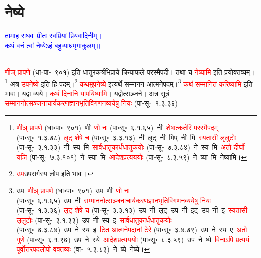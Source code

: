 \section[नेष्ये]{नेष्ये}
\centering\textcolor{blue}{तामाह राघवः प्रीतः स्वप्रियां प्रियवादिनीम्।\nopagebreak\\
कथं वनं त्वां नेष्येऽहं बहुव्याघ्रमृगाकुलम्॥}\nopagebreak\\
\\
\fontsize{14}{21}\selectfont\begin{sloppypar}\justifying\noindent\hspace{10mm} \textcolor{red}{णीञ् प्रापणे} (धा॰पा॰~९०१) इति धातुरकर्त्रभिप्राये क्रियाफले परस्मैपदी। तथा च \textcolor{red}{नेष्यामि} इति प्रयोक्तव्यम्।\footnote{\textcolor{red}{णीञ् प्रापणे} (धा॰पा॰~९०१)~\arrow णी~\arrow \textcolor{red}{णो नः} (पा॰सू॰~६.१.६५)~\arrow नी~\arrow \textcolor{red}{शेषात्कर्तरि परस्मैपदम्} (पा॰सू॰~१.३.७८)~\arrow \textcolor{red}{लृट् शेषे च} (पा॰सू॰~३.३.१३)~\arrow नी~लृट्~\arrow नी~मिप्~\arrow नी~मि~\arrow \textcolor{red}{स्यतासी लृलुटोः} (पा॰सू॰~३.१.३३)~\arrow नी~स्य~मि~\arrow \textcolor{red}{सार्वधातुकार्ध\-धातुकयोः} (पा॰सू॰~७.३.८४)~\arrow ने~स्य~मि~\arrow \textcolor{red}{अतो दीर्घो यञि} (पा॰सू॰~७.३.१०१)~\arrow ने~स्या~मि~\arrow \textcolor{red}{आदेश\-प्रत्यययोः} (पा॰सू॰~८.३.५९)~\arrow ने~ष्या~मि~\arrow नेष्यामि।} अत्र \textcolor{red}{उपनेष्ये} इति हि पदम्।\footnote{\textcolor{red}{उप}उपसर्गस्य लोप इति भावः।} \textcolor{red}{कथमुपनेष्ये} इत्यर्थे सम्मानन आत्मनेपदम्।\footnote{उप~\textcolor{red}{णीञ् प्रापणे} (धा॰पा॰~९०१)~\arrow उप~णी~\arrow \textcolor{red}{णो नः} (पा॰सू॰~६.१.६५)~\arrow उप~नी~\arrow \textcolor{red}{सम्माननोत्सञ्जनाचार्य\-करण\-ज्ञान\-भृति\-विगणन\-व्ययेषु नियः} (पा॰सू॰~१.३.३६)~\arrow \textcolor{red}{लृट् शेषे च} (पा॰सू॰~३.३.१३)~\arrow उप~नी~लृट्~\arrow उप~नी~इट्~\arrow उप~नी~इ~\arrow \textcolor{red}{स्यतासी लृलुटोः} (पा॰सू॰~३.१.३३)~\arrow उप~नी~स्य~इ~\arrow \textcolor{red}{सार्वधातुकार्ध\-धातुकयोः} (पा॰सू॰~७.३.८४)~\arrow उप~ने~स्य~इ~\arrow \textcolor{red}{टित आत्मनेपदानां टेरे} (पा॰सू॰~३.४.७९)~\arrow उप~ने~स्य~ए~\arrow \textcolor{red}{अतो गुणे} (पा॰सू॰~६.१.९७)~\arrow उप~ने~स्ये~\arrow \textcolor{red}{आदेश\-प्रत्यययोः} (पा॰सू॰~८.३.५९)~\arrow उप~ने~ष्ये~\arrow \textcolor{red}{विनाऽपि प्रत्ययं पूर्वोत्तर\-पद\-लोपो वक्तव्यः} (वा॰~५.३.८३)~\arrow ने~ष्ये~\arrow नेष्ये।} \textcolor{red}{कथं सम्मानितं करिष्यामि} इति भावः। यद्वा व्यये। \textcolor{red}{कथं दिनानि यापयिष्यामि}। यद्वोत्सञ्जने। अत्र सूत्रं \textcolor{red}{सम्माननोत्सञ्जनाचार्य\-करण\-ज्ञान\-भृति\-विगणन\-व्ययेषु नियः} (पा॰सू॰~१.३.३६)।
\end{sloppypar}
